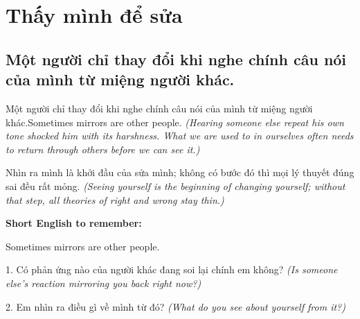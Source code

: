 \chapter{Thấy mình để sửa}

\section{Một người chỉ thay đổi khi nghe chính câu nói của mình từ miệng người khác.}
\begin{truyen}{Một người chỉ thay đổi khi nghe chính câu nói của mình từ miệng người khác.}{Sometimes mirrors are other people.}
\textit{(Hearing someone else repeat his own tone shocked him with its harshness. What we are used to in ourselves often needs to return through others before we can see it.)}
\end{truyen}
\begin{baihoc}
Nhìn ra mình là khởi đầu của sửa mình; không có bước đó thì mọi lý thuyết đúng sai đều rất mỏng.
\textit{(Seeing yourself is the beginning of changing yourself; without that step, all theories of right and wrong stay thin.)}
\end{baihoc}
\begin{ghinhoanh}\textbf{Short English to remember:}

Sometimes mirrors are other people.
\end{ghinhoanh}
\begin{tuhocnhanh}
1. Có phản ứng nào của người khác đang soi lại chính em không? \textit{(Is someone else's reaction mirroring you back right now?)}

2. Em nhìn ra điều gì về mình từ đó? \textit{(What do you see about yourself from it?)}
\end{tuhocnhanh}
\ngancach

